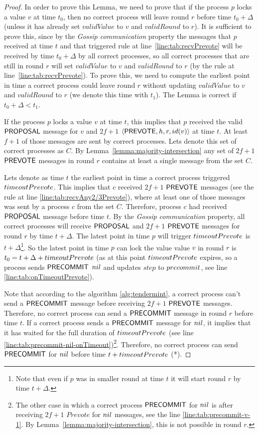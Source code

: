 \begin{proof}
In order to prove this Lemma, we need to prove that if the process $p$ locks a value $v$ at time $t_0$, then no correct process will leave round $r$ before time $t_0 + \Delta$ (unless it has already set $validValue$ to $v$ and $validRound$ to $r$). It is sufficient to prove this, since by the \emph{Gossip communication} property the messages that $p$ received at time $t$ and that triggered rule at line~\ref{line:tab:recvPrevote} will be received by time $t_0 + \Delta$ by all correct processes, so all correct processes that are still in round $r$ will set $validValue$ to $v$ and $validRound$ to $r$ (by the rule at line~\ref{line:tab:recvPrevote}). To prove this, we need to compute the earliest point in time a correct process could leave round $r$ without updating $validValue$ to $v$ and $validRound$ to $r$ (we denote this time with $t_1$). The Lemma is correct if $t_0 + \Delta < t_1$. 

If the process $p$ locks a value $v$ at time $t$, this implies that $p$ received the valid $\mathsf{PROPOSAL}$ message for $v$ and $2f+1$ $\langle\mathsf{PREVOTE},h,r,id(v)\rangle$ at time $t$. At least $f+1$ of those messages are sent by correct processes. Lets denote this set of correct processes as $C$. By Lemma~\ref{lemma:majority-intersection} any set of $2f+1$ $\mathsf{PREVOTE}$ messages in round $r$ contains at least a single message from the set $C$. 

Lets denote as time $t$ the earliest point in time a correct process triggered $timeoutPrevote$. This implies that $c$ received $2f+1$ $\mathsf{PREVOTE}$ messages
(see the rule at line \ref{line:tab:recvAny2/3Prevote}), where at least one of those messages was sent by a process $c$ from the set $C$.  Therefore, process $c$ had received $\mathsf{PROPOSAL}$ message before time $t$. By the \emph{Gossip communication} property, all correct processes will receive $\mathsf{PROPOSAL}$ and $2f+1$ $\mathsf{PREVOTE}$ messages for round $r$ by time $t+\Delta$. The latest point in time $p$ will trigger $timeoutPrevote$ is $t+\Delta$\footnote{Note that even if $p$ was in smaller round at time $t$ it will start round $r$ by time $t+\Delta$.}.  So the latest point in time $p$ can lock the value value $v$ in round $r$ is $t_0 = t+\Delta+timeoutPrevote$ (as at this point $timeoutPrevote$ expires, so a process sends $\mathsf{PRECOMMIT}$ $nil$ and updates $step$ to $precommit$, see line \ref{line:tab:onTimeoutPrevote}).  

Note that according to the algorithm \ref{alg:tendermint}, a correct process can't send a $\mathsf{PRECOMMIT}$ message before receiving $2f+1$ $\mathsf{PREVOTE}$ messages.  Therefore, no correct process can send a $\mathsf{PRECOMMIT}$ message in round $r$ before time $t$. If a correct process sends a $\mathsf{PRECOMMIT}$ message for $nil$, it implies that it has waited for the full duration of $timeoutPrevote$ (see line \ref{line:tab:precommit-nil-onTimeout})\footnote{The other case in which a correct process $\mathsf{PRECOMMIT}$ for $nil$ is after receiving $2f+1$ $Prevote$ for $nil$ messages, see the line \ref{line:tab:precommit-v-1}. By Lemma~\ref{lemma:majority-intersection}, this is not possible in round $r$.}. Therefore, no correct process can send $\mathsf{PRECOMMIT}$ for $nil$ before time $t + timeoutPrevote$ (*).


\end{proof}
